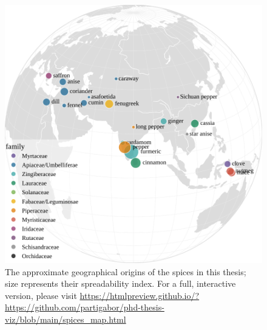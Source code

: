 \begin{figure}[ht!]
  \includegraphics[width=\linewidth]{imgs/plots/spices_map.pdf}
  \caption{The approximate geographical origins of the spices in this thesis; size represents their spreadability index. For a full, interactive version, please visit \url{https://htmlpreview.github.io/?https://github.com/partigabor/phd-thesis-viz/blob/main/spices_map.html}}
  \label{fig:spices_map}
\end{figure}



